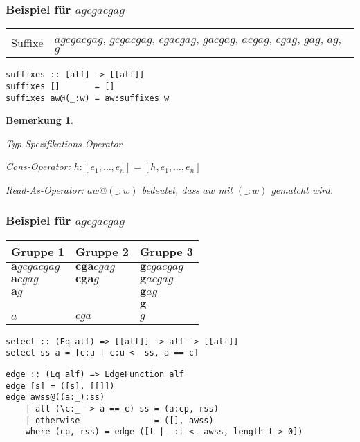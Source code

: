 \documentclass{beamer}
\newtheorem{remark}{Bemerkung}
\begin{document}
\begin{frame}[fragile]
\frametitle{Beispiel für $agcgacgag$}
\begin{tabularx}{\textwidth}{l X}
Suffixe &  $agcgacgag$, $gcgacgag$, $cgacgag$, $gacgag$, $acgag$, $cgag$, $gag$, $ag$, $g$ \\
\end{tabularx}
\medskip
\begin{lstlisting}
suffixes :: [alf] -> [[alf]]
suffixes []       = []
suffixes aw@(_:w) = aw:suffixes w
\end{lstlisting}
\bigskip
\begin{remark}
\begin{description}[l]
    \item[Operator $(::)$] Typ-Spezifikations-Operator
    \item[Operator $(:)$] Cons-Operator: $h:[e_1, \dots, e_n] = [h, e_1, \dots, e_n]$
    \item[Operator $(@)$] Read-As-Operator: $aw@(\_:w)$ bedeutet, dass $aw$ mit $(\_:w)$ gematcht wird.
\end{description}
\end{remark}
\end{frame}

\begin{frame}[fragile]
\frametitle{Beispiel für $agcgacgag$}
\begin{table}
\begin{tabular}{l l l}
    \toprule
    Gruppe 1                 & Gruppe 2               & Gruppe 3                \\
    \midrule
    $\boldsymbol{a}gcgacgag$ & $\boldsymbol{cga}cgag$ & $\boldsymbol{g}cgacgag$ \\
    $\boldsymbol{a}cgag$     & $\boldsymbol{cga}g$    & $\boldsymbol{g}acgag$   \\
    $\boldsymbol{a}g$        &                        & $\boldsymbol{g}ag$      \\
                             &                        & $\boldsymbol{g}$        \\
    \midrule
    $a$                      & $cga$                  & $g$                     \\
    \bottomrule
\end{tabular}
\end{table}
\begin{lstlisting}
select :: (Eq alf) => [[alf]] -> alf -> [[alf]]
select ss a = [c:u | c:u <- ss, a == c]
\end{lstlisting}
\begin{lstlisting}
edge :: (Eq alf) => EdgeFunction alf
edge [s] = ([s], [[]])
edge awss@((a:_):ss)
    | all (\c:_ -> a == c) ss = (a:cp, rss)
    | otherwise               = ([], awss)
    where (cp, rss) = edge ([t | _:t <- awss, length t > 0])
\end{lstlisting}
\end{frame}
\end{document}
